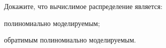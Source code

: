 Докажите, что вычислимое распределение является:
\begin{enumcyr}
    \item полиномиально моделируемым;
    \item обратимым полиномиально моделируемым.
\end{enumcyr}